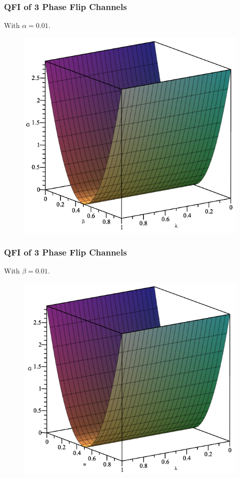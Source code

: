 \documentclass{beamer}
\begin{document}
\begin{frame}
\frametitle{QFI of 3 Phase Flip Channels}
With $\alpha=0.01$.
\begin{figure}
\begin{center}
\includegraphics[width=0.75\linewidth]{Phase-Flip-Triple-Channel-r=001-Alpha=001-Gain-Graph.png}
\end{center}
\end{figure}
\end{frame}
\begin{frame}
\frametitle{QFI of 3 Phase Flip Channels}
With $\beta=0.01$.
\begin{figure}
\begin{center}
\includegraphics[width=0.75\linewidth]{Phase-Flip-Triple-Channel-r=001-Beta=001-Gain-Graph.png}
\end{center}
\end{figure}
\end{frame}
\end{document}

